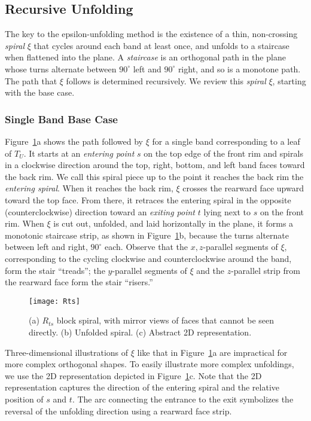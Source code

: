 \documentclass[11pt]{article}
\begin{document}
\subsection{Recursive Unfolding}

The key to the epsilon-unfolding method is the existence of a thin, non-crossing \emph{spiral} $\xi$ that cycles around each band
at least once, and unfolds to a staircase when flattened into the
plane.
A \emph{staircase} is an orthogonal path in the plane whose turns
alternate between $90^\circ$ left and  $90^\circ$ right, and so is a
monotone path.
The path that $\xi$ follows is determined recursively.
We review this \emph{spiral} $\xi$, starting with the base case.

\subsubsection{Single Band Base Case}
\label{sec:basecase}

Figure~\ref{fig:Rts}a shows the path followed by $\xi$ for a single band corresponding to a leaf of $T_U$.
It starts at an \emph{entering point} $s$ on the top edge of
the front rim and spirals in a clockwise direction around the top, right, bottom, and left band faces toward the back rim. We call this spiral piece up to the point it reaches the back rim the
\emph{entering spiral}.
When it reaches the back rim, $\xi$ crosses the rearward face upward toward the top face.
From there, it retraces the entering spiral in the opposite (counterclockwise)
direction toward an \emph{exiting point} $t$  lying next to $s$ on
the front rim.
When $\xi$ is cut out, unfolded, and laid horizontally in the plane,
it forms a monotonic staircase strip, as shown in
Figure~\ref{fig:Rts}b, because the turns alternate between left and
right, $90^\circ$ each.
Observe that
the $x,z$-parallel segments of $\xi$, corresponding to the cycling
clockwise and counterclockwise around the band, form the stair ``treads'';
the $y$-parallel segments of $\xi$ and the $z$-parallel strip from the rearward face
form the stair ``risers.''


\begin{figure}[htbp]
\centering
\texttt{[image: Rts]}
\caption{(a) $R_{ts}$ block spiral, with
mirror views of faces that cannot be seen directly.
(b) Unfolded spiral.
(c) Abstract 2D representation.}
\label{fig:Rts}
\end{figure}


Three-dimensional illustrations of $\xi$ like that in Figure~\ref{fig:Rts}a
are impractical for
more complex orthogonal shapes. To easily illustrate more complex unfoldings, we
use the 2D representation
depicted in Figure~\ref{fig:Rts}c.
Note that the 2D representation captures the direction of the entering spiral and
the relative position of $s$ and $t$. The arc connecting the entrance to the exit
symbolizes the reversal of the unfolding direction
using a rearward face strip.
\end{document}
